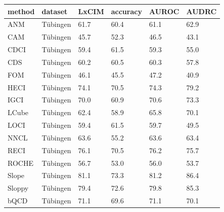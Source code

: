 \begin{tabular}{llllll}
\toprule
method & dataset & LxCIM & accuracy & AUROC & AUDRC \\
\midrule
ANM & Tübingen & 61.7 & 60.4 & 61.1 & 62.9 \\
CAM & Tübingen & 45.7 & 52.3 & 46.5 & 43.1 \\
CDCI & Tübingen & 59.4 & 61.5 & 59.3 & 55.0 \\
CDS & Tübingen & 60.2 & 60.5 & 60.3 & 57.8 \\
FOM & Tübingen & 46.1 & 45.5 & 47.2 & 40.9 \\
HECI & Tübingen & 74.1 & 70.5 & 74.3 & 79.2 \\
IGCI & Tübingen & 70.0 & 60.9 & 70.6 & 73.3 \\
LCube & Tübingen & 62.4 & 58.9 & 65.8 & 70.1 \\
LOCI & Tübingen & 59.4 & 61.5 & 59.7 & 49.5 \\
NNCL & Tübingen & 63.6 & 55.2 & 63.6 & 63.4 \\
RECI & Tübingen & 76.1 & 70.5 & 76.2 & 75.7 \\
ROCHE & Tübingen & 56.7 & 53.0 & 56.0 & 53.7 \\
Slope & Tübingen & 81.1 & 73.3 & 81.2 & 86.4 \\
Sloppy & Tübingen & 79.4 & 72.6 & 79.8 & 85.3 \\
bQCD & Tübingen & 71.1 & 69.6 & 71.1 & 70.1 \\
\bottomrule
\end{tabular}
